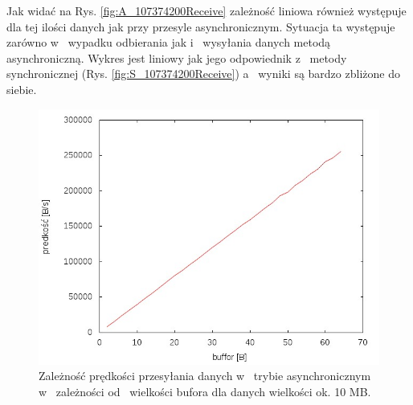 \documentclass{BscUS}
\begin{document}
\noindent Jak widać na Rys. \ref{fig:A_107374200Receive} zależność liniowa również występuje dla tej ilości danych jak przy przesyle asynchronicznym. Sytuacja ta występuje zarówno w~ wypadku odbierania jak i~ wysyłania danych metodą asynchroniczną. Wykres jest liniowy jak jego odpowiednik z~ metody synchronicznej (Rys. \ref{fig:S_107374200Receive}) a~ wyniki są bardzo zbliżone do siebie.


\begin{figure}[H]
{
\centering
\captionsetup{justification=centering}
\includegraphics[width=1\textwidth]{./img/A_10737420Receive}
\caption{Zależność prędkości przesyłania danych w~ trybie asynchronicznym w~ zależności od~ wielkości bufora dla danych wielkości ok. 10 MB.}
\label{fig:A_10737420Receive}
}
\end{figure}
\end{document}
